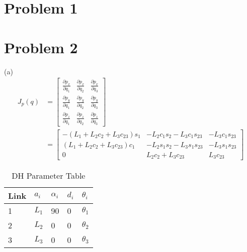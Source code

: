 \documentclass[twoside,11pt]{homework}
\date{\today} %
\begin{document}
\maketitle

\section*{Problem 1}

\section*{Problem 2}
(a)\\
\begin{equation}
\begin{split}
J_p(q) &= 
\begin{bmatrix}
\frac{\partial p_x}{\partial q_1} & \frac{\partial p_x}{\partial q_2} & \frac{\partial p_x}{\partial q_3} \\
\frac{\partial p_y}{\partial q_1} & \frac{\partial p_y}{\partial q_2} & \frac{\partial p_y}{\partial q_3}  \\
\frac{\partial p_z}{\partial q_1} & \frac{\partial p_z}{\partial q_2} & \frac{\partial p_z}{\partial q_3} 
\end{bmatrix}\\
&= \begin{bmatrix}
-(L_1+L_2c_2+L_3c_{23})s_1 & -L_2c_1s_2-L_3c_1s_{23} & -L_3c_1s_{23} \\
 (L_1+L_2c_2+L_3c_{23})c_1 & -L_2s_1s_2-L_3s_1s_{23} & -L_3s_1s_{23}  \\
0 & L_2c_2+L_3c_{23} & L_3c_{23}
\end{bmatrix}
\end{split}
\end{equation}

%
\begin{table}[h!] \centering
\caption{DH Parameter Table}
\begin{tabular}{|l|l|l|l|l|}
\hline
Link & $a_i$ & \textbf{$\alpha_i$} & $d_i$   & $\theta_i$ \\ \hline
1             & $L_1$            & 90                 & 0      & $\theta_1$ \\ \hline
2             & $L_2$           & 0                   &0      &  $\theta_2$       \\ \hline
3             & $L_3$             & 0                 & 0   & $\theta_3$        \\ \hline
\end{tabular}
\end{table}
%
\end{document}
